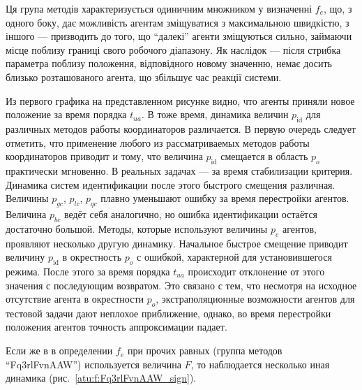 Ця група методів характеризується одиничним множником у визначенні $f_e$, що,
з одного боку, дає можливість агентам зміщуватися з максимальною швидкістю, з
іншого --- призводить до того, що ``далекі'' агенти зміщуються сильно,
займаючи місце поблизу границі свого робочого діапазону. Як наслідок --- після
стрибка параметра поблизу положення, відповідного новому значенню, немає
досить близько розташованого агента, що збільшує час реакції системи.

Из первого графика на представленном рисунке
видно, что агенты приняли новое положение за время порядка $t_{ua}$.
В тоже время, динамика величин $p_\mathrm{id}$ для различных методов работы координаторов
различается. В первую очередь следует отметить, что применение любого из рассматриваемых
методов работы координаторов приводит и тому, что величина $p_\mathrm{id}$
смещается в область $p_o$ практически мгновенно. В реальных задачах --- за время стабилизации критерия.
Динамика систем идентификации после этого быстрого смещения различная.
Величины $p_{gc}$, $p_{lc}$, $p_{qc}$ плавно уменьшают ошибку за время
перестройки агентов. Величина $p_{bc}$ ведёт себя аналогично, но ошибка
идентификации остаётся достаточно большой. Методы, которые используют величины $p_e$
агентов, проявляют несколько другую динамику. Начальное быстрое смещение
приводит величину $p_\mathrm{id}$ в окрестность $p_o$ с ошибкой,
характерной для установившегося режима. После этого за время порядка $t_{ua}$
происходит отклонение от этого значения с последующим возвратом.
Это связано с тем, что несмотря на исходное отсутствие агента в окрестности
$p_o$, экстраполяционные возможности агентов для тестовой задачи
дают неплохое приближение, однако, во время перестройки положения агентов
точность аппроксимации падает.


Если же в в определении $f_e$ при прочих равных (группа методов ``Fq3rlFvnAAW'')
используется величина $F$,
то наблюдается несколько иная динамика
(рис.~\ref{atu:f:Fq3rlFvnAAW_sign}).

